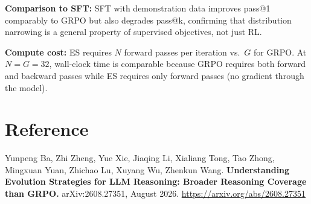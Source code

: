 \documentclass[10pt,twocolumn]{article}
\begin{document}
\textbf{Comparison to SFT:} SFT with demonstration data improves
pass@1 comparably to GRPO but also degrades pass@k, confirming
that distribution narrowing is a general property of supervised
objectives, not just RL.

\textbf{Compute cost:} ES requires $N$ forward passes per iteration
vs.\ $G$ for GRPO. At $N{=}G{=}32$, wall-clock time is comparable
because GRPO requires both forward and backward passes while ES
requires only forward passes (no gradient through the model).

\section*{Reference}

Yunpeng Ba, Zhi Zheng, Yue Xie, Jiaqing Li, Xialiang Tong, Tao Zhong,
Mingxuan Yuan, Zhichao Lu, Xuyang Wu, Zhenkun Wang.
\textbf{Understanding Evolution Strategies for LLM Reasoning:
Broader Reasoning Coverage than GRPO.}
arXiv:2608.27351, August 2026.
\url{https://arxiv.org/abs/2608.27351}
\end{document}
